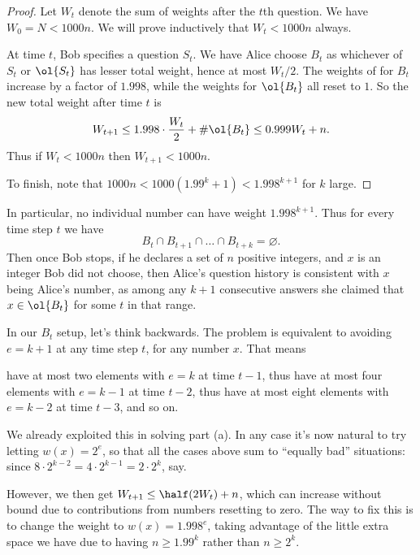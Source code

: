 \documentclass[11pt]{scrartcl}
\begin{document}
\begin{proof}
  Let $W_{t}$ denote the sum of weights after the $t$th question.
  We have $W_0 = N < 1000n$.
  We will prove inductively that $W_t < 1000n$ always.

  At time $t$, Bob specifies a question $S_t$.
  We have Alice choose $B_t$ as whichever of $S_t$ or $\ol{S_t}$
  has lesser total weight, hence at most $W_t/2$.
  The weights of for $B_t$ increase by a factor of $1.998$,
  while the weights for $\ol{B_t}$ all reset to $1$.
  So the new total weight after time $t$ is
  \[ W_{t+1} \le 1.998 \cdot \frac{W_t}{2}
    + \# \ol{B_t} \le 0.999 W_t + n. \]
  Thus if $W_t < 1000n$ then $W_{t+1} < 1000n$.

  To finish, note that
  $1000n < 1000 \left( 1.99^k + 1 \right) < 1.998^{k+1}$
  for $k$ large.
\end{proof}

In particular, no individual number can have weight $1.998^{k+1}$.
Thus for every time step $t$ we have
\[ B_t \cap B_{t+1} \cap \dots \cap B_{t+k} = \varnothing. \]
Then once Bob stops, if he declares a set of $n$ positive integers,
and $x$ is an integer Bob did not choose,
then Alice's question history is consistent with $x$ being Alice's number,
as among any $k+1$ consecutive answers
she claimed that $x \in \ol{B_t}$ for some $t$ in that range.

\begin{remark*}
  [Motivation]
  In our $B_t$ setup, let's think backwards.
  The problem is equivalent to avoiding $e = k+1$ at any time step $t$,
  for any number $x$.
  That means
  \begin{itemize}
    \ii have at most two elements with $e = k$ at time $t-1$,
    \ii thus have at most four elements with $e = k-1$ at time $t-2$,
    \ii thus have at most eight elements with $e = k-2$ at time $t-3$,
    \ii and so on.
  \end{itemize}
  We already exploited this in solving part (a).
  In any case it's now natural to try letting $w(x) = 2^e$,
  so that all the cases above sum to ``equally bad'' situations:
  since $8 \cdot 2^{k-2} = 4 \cdot 2^{k-1} = 2 \cdot 2^k$, say.

  However, we then get $W_{t+1} \le \half (2W_t) + n$,
  which can increase without bound due to contributions
  from numbers resetting to zero.
  The way to fix this is to change the weight to $w(x) = 1.998^e$,
  taking advantage of the little extra space we have
  due to having $n \ge 1.99^k$ rather than $n \ge 2^k$.
\end{remark*}
\pagebreak
\end{document}
